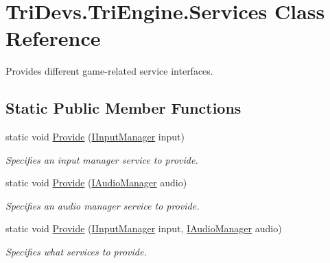 \hypertarget{class_tri_devs_1_1_tri_engine_1_1_services}{\section{Tri\-Devs.\-Tri\-Engine.\-Services Class Reference}
\label{class_tri_devs_1_1_tri_engine_1_1_services}
}


Provides different game-\/related service interfaces.  


\subsection*{Static Public Member Functions}
\begin{DoxyCompactItemize}
\item 
static void \hyperlink{class_tri_devs_1_1_tri_engine_1_1_services_a1a6c1db541be81163fc36225dbf1df63}{Provide} (\hyperlink{interface_tri_devs_1_1_tri_engine_1_1_input_1_1_i_input_manager}{I\-Input\-Manager} input)
\begin{DoxyCompactList}\small\item\em Specifies an input manager service to provide. \end{DoxyCompactList}\item 
static void \hyperlink{class_tri_devs_1_1_tri_engine_1_1_services_abbaa2b2acbe05e41737dedcbc8cb8600}{Provide} (\hyperlink{interface_tri_devs_1_1_tri_engine_1_1_audio_1_1_i_audio_manager}{I\-Audio\-Manager} audio)
\begin{DoxyCompactList}\small\item\em Specifies an audio manager service to provide. \end{DoxyCompactList}\item 
static void \hyperlink{class_tri_devs_1_1_tri_engine_1_1_services_abfb5210455f5ad166ba82e4afe11b006}{Provide} (\hyperlink{interface_tri_devs_1_1_tri_engine_1_1_input_1_1_i_input_manager}{I\-Input\-Manager} input, \hyperlink{interface_tri_devs_1_1_tri_engine_1_1_audio_1_1_i_audio_manager}{I\-Audio\-Manager} audio)
\begin{DoxyCompactList}\small\item\em Specifies what services to provide. \end{DoxyCompactList}\end{DoxyCompactItemize}
